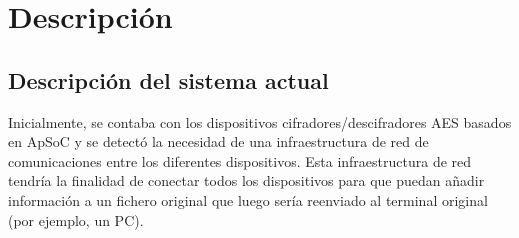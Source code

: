 \chapter{Descripción}
\section{Descripción del sistema actual}
Inicialmente, se contaba con los dispositivos cifradores/descifradores AES basados en ApSoC y se detectó la necesidad de una infraestructura de red de comunicaciones entre los diferentes dispositivos. Esta infraestructura de red tendría la finalidad de conectar todos los dispositivos para que puedan añadir información a un fichero original que luego sería reenviado al terminal original (por ejemplo, un PC).


%
%
%
%
%
%
%
%
%
%
